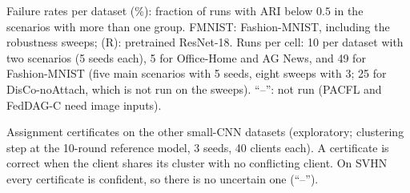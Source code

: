\begin{tableorg}[!htbp]
\centering
\caption{Failure rates per dataset (\%): fraction of runs with ARI below $0.5$ in the scenarios with more than one group. FMNIST: Fashion-MNIST, including the robustness sweeps; (R): pretrained ResNet-18. Runs per cell: 10 per dataset with two scenarios (5 seeds each), 5 for Office-Home and AG News, and 49 for Fashion-MNIST (five main scenarios with 5 seeds, eight sweeps with 3; 25 for DisCo-noAttach, which is not run on the sweeps). ``--'': not run (PACFL and FedDAG-C need image inputs).}\label{tab:failure_ds}

\end{tableorg}

\begin{table}[!htbp]
\centering
\caption{Assignment certificates on the other small-CNN datasets (exploratory; clustering step at the 10-round reference model, 3 seeds, 40 clients each). A certificate is correct when the client shares its cluster with no conflicting client. On SVHN every certificate is confident, so there is no uncertain one (``--'').}\label{tab:cert_ext}

\end{table}
